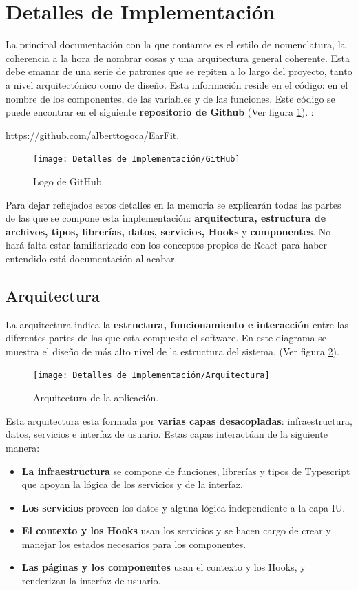 \documentclass[12pt,twoside,titlepage]{report}
\begin{document}
\section{Detalles de Implementación}
La principal documentación con la que contamos es el estilo de nomenclatura, la coherencia a la hora de nombrar cosas y una arquitectura general coherente. Esta debe emanar de una serie de patrones que se repiten a lo largo del proyecto, tanto a nivel arquitectónico como de diseño. Esta información reside en el código: en el nombre de los componentes, de las variables y de las funciones. Este código se puede encontrar en el siguiente \textbf{repositorio de Github} (Ver figura \ref{fig:GitHubLogo}).
:

\url{https://github.com/alberttogoca/EarFit}.

\begin{figure}[H]
    \centering
    \texttt{[image: Detalles de Implementación/GitHub]}
    \caption{Logo de GitHub.}
    \label{fig:GitHubLogo}
\end{figure}

Para dejar reflejados estos detalles en la memoria se explicarán todas las partes de las que se compone esta implementación: \textbf{arquitectura, estructura de archivos, tipos, librerías, datos, servicios, Hooks} y \textbf{componentes}. No hará falta estar familiarizado con los conceptos propios de React para haber entendido está documentación al acabar.

\subsection{Arquitectura}

La arquitectura indica la \textbf{estructura, funcionamiento e interacción} entre las diferentes partes de las que esta compuesto el software. En este diagrama se muestra el diseño de más alto nivel de la estructura del sistema.
(Ver figura \ref{fig:Arquitectura}).

\begin{figure}[H]
    \centering
    \texttt{[image: Detalles de Implementación/Arquitectura]}
    \caption{Arquitectura de la aplicación.}
    \label{fig:Arquitectura}
\end{figure}

Esta arquitectura esta formada por \textbf{varias capas desacopladas}: infraestructura, datos, servicios e interfaz de usuario. Estas capas interactúan de la siguiente manera:

\begin{itemize}
    \item \textbf{La infraestructura} se compone de funciones, librerías y tipos de Typescript que apoyan la lógica de los servicios y de la interfaz.
    \item \textbf{Los servicios} proveen los datos y alguna lógica independiente a la capa IU.
    \item \textbf{El contexto y los Hooks} usan los servicios y se hacen cargo de crear y manejar los estados necesarios para los componentes.
    \item \textbf{Las páginas y los componentes} usan el contexto y los Hooks, y renderizan la interfaz de usuario.
\end{itemize}
\end{document}
